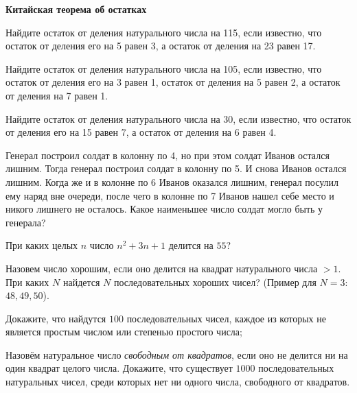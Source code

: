 \documentclass{article}
\begin{document}
    \large

    \begin{center}
        \textbf{Китайская теорема об остатках}
    \end{center}

    \begin{enumerate_boxed}

        \item Найдите остаток от деления натурального числа на 115, если известно, что остаток от деления его на 5 равен 3, а остаток от деления на 23 равен 17.

        \item Найдите остаток от деления натурального числа на 105, если известно, что остаток от деления его на 3 равен 1, остаток от деления на 5 равен 2, а остаток от деления на 7 равен 1.

        \item Найдите остаток от деления натурального числа на 30, если известно, что остаток от деления его на 15 равен 7, а остаток от деления на 6 равен 4.

        \item Генерал построил солдат в колонну по 4, но при этом солдат Иванов остался лишним.
        Тогда генерал построил солдат в колонну по 5.
        И снова Иванов остался лишним.
        Когда же и в колонне по 6 Иванов оказался лишним, генерал посулил ему наряд вне очереди, после чего в колонне по 7 Иванов нашел себе место и никого лишнего не осталось.
        Какое наименьшее число солдат могло быть у генерала?

        \item При каких целых $n$ число $n^2 + 3n + 1$ делится на $55$?

        \item Назовем число хорошим, если оно делится на квадрат натурального числа $> 1$.
        При каких $N$ найдется $N$ последовательных хороших чисел?
        (Пример для $N = 3$: $48, 49, 50$).

        \item Докажите, что найдутся $100$ последовательных чисел, каждое из которых не является простым числом или степенью простого числа;

        \item Назовём натуральное число \textit{свободным от квадратов}, если оно не делится ни на один квадрат целого числа.
        Докажите, что существует $1000$ последовательных натуральных чисел, среди которых нет ни одного числа, свободного от квадратов.


\end{enumerate_boxed}
\end{document}
